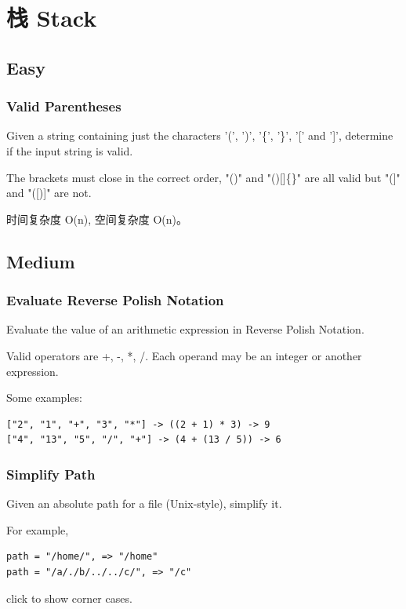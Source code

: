\documentclass[12pt]{book}
\begin{document}
\chapter{栈 Stack}
\label{sec-5}
\section{Easy}
\label{sec-5-1}
\subsection{Valid Parentheses}
\label{sec-5-1-1}
Given a string containing just the characters '(', ')', '\{', '\}', '[' and ']', determine if the input string is valid.

The brackets must close in the correct order, "()" and "()[]\{\}" are all valid but "(]" and "([)]" are not.

时间复杂度 O(n), 空间复杂度 O(n)。

\section{Medium}
\label{sec-5-2}
\subsection{Evaluate Reverse Polish Notation}
\label{sec-5-2-1}
Evaluate the value of an arithmetic expression in Reverse Polish Notation.

Valid operators are +, -, *, /. Each operand may be an integer or another expression.

Some examples:
\lstset{language=java,label= ,caption= ,numbers=none}
\begin{lstlisting}
["2", "1", "+", "3", "*"] -> ((2 + 1) * 3) -> 9
["4", "13", "5", "/", "+"] -> (4 + (13 / 5)) -> 6
\end{lstlisting}

\subsection{Simplify Path}
\label{sec-5-2-2}
Given an absolute path for a file (Unix-style), simplify it.

For example,
\lstset{language=java,label= ,caption= ,numbers=none}
\begin{lstlisting}
path = "/home/", => "/home"
path = "/a/./b/../../c/", => "/c"
\end{lstlisting}

click to show corner cases.
\end{document}
